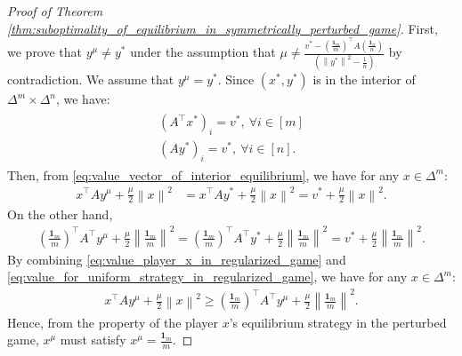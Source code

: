 \documentclass[10pt,a4paper]{amsart}
\newcommand{\bone}{\mathbf{1}}
\begin{document}
\begin{proof}[Proof of Theorem \ref{thm:suboptimality_of_equilibrium_in_symmetrically_perturbed_game}]
    First, we prove that $y^{\mu}\neq y^{\ast}$ under the assumption that $\mu \neq \frac{v^{\ast} - \left(\frac{\bone_m}{m}\right)^{\top}A\left(\frac{\bone_n}{n}\right)}{\left(\left\|y^{\ast}\right\|^2 - \frac{1}{n}\right)}$ by contradiction.
    We assume that $y^{\mu} = y^{\ast}$.
    Since $(x^{\ast}, y^{\ast})$ is in the interior of $\Delta^m \times \Delta^n$, we have:
    \begin{align}
        \begin{aligned}
            (A^{\top}x^{\ast})_i = v^{\ast}, ~\forall i\in [m] \\
            (Ay^{\ast})_i = v^{\ast}, ~\forall i\in [n].
        \end{aligned}
        \label{eq:value_vector_of_interior_equilibrium}
    \end{align}
    Then, from \eqref{eq:value_vector_of_interior_equilibrium}, we have for any $x\in \Delta^m$:
    \begin{align}
        x^{\top}Ay^{\mu} + \frac{\mu}{2} \left\|x\right\|^2 & = x^{\top}Ay^{\ast} + \frac{\mu}{2} \left\|x\right\|^2 = v^{\ast} + \frac{\mu}{2} \left\|x\right\|^2.
        \label{eq:value_player_x_in_regularized_game}
    \end{align}
    On the other hand,
    \begin{align}
        \left(\frac{\bone_m}{m}\right)^{\top}A^{\top}y^{\mu} + \frac{\mu}{2} \left\|\frac{\bone_m}{m}\right\|^2 = \left(\frac{\bone_m}{m}\right)^{\top}A^{\top}y^{\ast} + \frac{\mu}{2} \left\|\frac{\bone_m}{m}\right\|^2 =  v^{\ast} + \frac{\mu}{2} \left\|\frac{\bone_m}{m}\right\|^2.
        \label{eq:value_for_uniform_strategy_in_regularized_game}
    \end{align}
    By combining \eqref{eq:value_player_x_in_regularized_game} and \eqref{eq:value_for_uniform_strategy_in_regularized_game}, we have for any $x\in \Delta^m$:
    \begin{align*}
        x^{\top}Ay^{\mu} + \frac{\mu}{2} \left\|x\right\|^2 \geq \left(\frac{\bone_m}{m}\right)^{\top}A^{\top}y^{\mu} + \frac{\mu}{2} \left\|\frac{\bone_m}{m}\right\|^2.
    \end{align*}
    Hence, from the property of the player $x$'s equilibrium strategy in the perturbed game, $x^{\mu}$ must satisfy $x^{\mu} = \frac{\bone_m}{m}$.


\end{proof}
\end{document}

